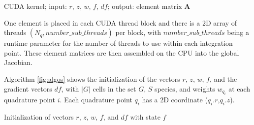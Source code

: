 \documentclass[12pt]{siamart}
\begin{document}
\begin{algorithm}[h!]
\begin{algorithmic}[100]
\ENDFOR
\ENDFOR
\ENDIF
{}
\ENDFOR
\ENDIF
\end{algorithmic} 
\caption{CUDA kernel; input: $r$, $z$, $w$, $f$, $df$;
  output: element matrix $\mathbf{A}$ }
\label{fig:algo2}
\end{algorithm}
One element is placed in each CUDA thread block and there is a 2D array of threads $(N_q, number\_sub\_threads)$ per block, with $number\_sub\_threads$ being  a runtime parameter for the number of threads to use within each integration point.
These element matrices are then assembled on the CPU into the global Jacobian.

Algorithm \ref{fig:algos}
shows the initialization of the vectors $r$, $z$, $w$, $f$, and the
gradient vectors $df$, with $|G|$ cells in the set
$G$, $S$ species, and weights $w_{q_i}$ at each quadrature point $i$.
Each quadrature point $q_i$ has a 2D coordinate ($q_i.r$,$q_i.z$).
\begin{algorithm}[h!]
\begin{algorithmic}[100]
\ENDFOR
\ENDFOR
\ENDFOR
\end{algorithmic} 
\caption{Initialization of vectors $r$, $z$, $w$, $f$, and $df$ with state $f$}
\label{fig:algos}
\end{algorithm}




\end{document}
